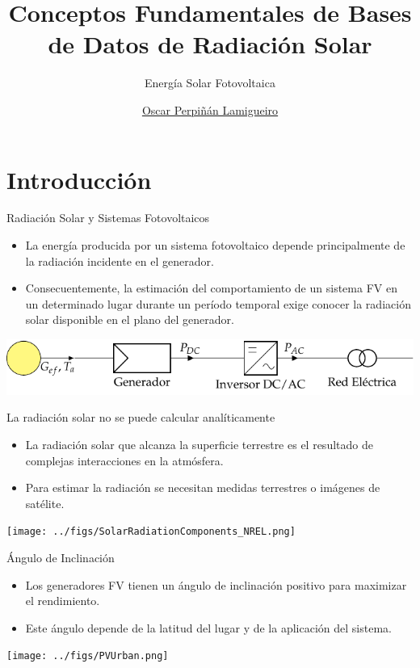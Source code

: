 \documentclass[aspectratio=169, usenames,svgnames,dvipsnames]{beamer}
\author{\href{https://oscarperpinan.github.io}{Oscar Perpiñán Lamigueiro}}
\date{}
\title{Conceptos Fundamentales de Bases de Datos de Radiación Solar}
\subtitle{Energía Solar Fotovoltaica}
\institute[UPM]{Universidad Politécnica de Madrid}
\begin{document}
\maketitle
\section{Introducción}
\label{sec:org31d446c}

\begin{frame}[label={sec:orgdbc68b9}]{Radiación Solar y Sistemas Fotovoltaicos}
\begin{itemize}
\item La \alert{energía producida} por un sistema fotovoltaico depende principalmente de la \alert{radiación incidente} en el generador.

\item Consecuentemente, la \alert{estimación del comportamiento} de un sistema FV en un determinado lugar durante un período temporal exige \alert{conocer la radiación solar disponible en el plano del generador}.
\end{itemize}

\begin{center}
\includegraphics[width=.9\linewidth]{../figs/SFCR_Esquema.pdf}
\end{center}
\end{frame}
\begin{frame}[label={sec:org416e37e}]{La radiación solar no se puede calcular analíticamente}
\begin{itemize}
\item La radiación solar que alcanza la superficie terrestre es el resultado de complejas interacciones en la atmósfera.
\item Para estimar la radiación se necesitan medidas terrestres o imágenes de satélite.
\end{itemize}
\begin{center}
\texttt{[image: ../figs/SolarRadiationComponents\_NREL.png]}
\end{center}
\end{frame}
\begin{frame}[label={sec:org7909544}]{Ángulo de Inclinación}
\begin{itemize}
\item Los generadores FV tienen un \alert{ángulo de inclinación positivo} para maximizar el rendimiento.
\item Este ángulo depende de la \alert{latitud} del lugar y de la \alert{aplicación del sistema}.
\end{itemize}

\begin{center}
\texttt{[image: ../figs/PVUrban.png]}
\end{center}
\end{frame}
\end{document}

